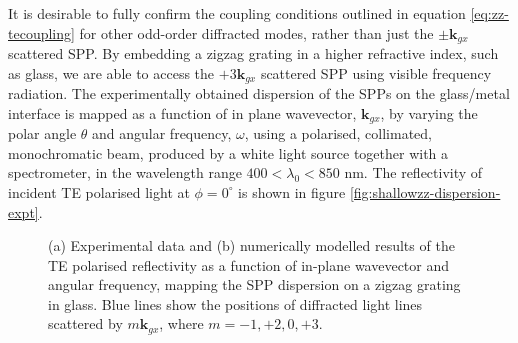 It is desirable to fully confirm the coupling conditions outlined in equation \ref{eq:zz-tecoupling} for other odd-order diffracted modes, rather than just the $\pm\mathbf{k}_{gx}$ scattered SPP. By embedding a zigzag grating in a higher refractive index, such as glass, we are able to access the $+3\mathbf{k}_{gx}$ scattered SPP using visible frequency radiation.
The experimentally obtained dispersion of the SPPs on the glass/metal interface is mapped as a function of in plane wavevector, $\mathbf{k}_{gx}$, by varying the polar angle $\theta$ and angular frequency, $\omega$, using a polarised, collimated, monochromatic beam, produced by a white light source together with a spectrometer, in the wavelength range $400 < \lambda_0 < 850$ nm.
The reflectivity of incident TE polarised light at $\phi = 0^\circ$ is shown in figure \ref{fig:shallowzz-dispersion-expt}. 
\begin{figure}
\begin{center}
\caption[SPP dispersion on a zigzag grating in glass measured using TE polarised light.]{(a) Experimental data and (b) numerically modelled results of the TE polarised reflectivity as a function of in-plane wavevector and angular frequency, mapping the SPP dispersion on a zigzag grating in glass. \color{blue}Blue \color{black} lines show the positions of diffracted light lines scattered by $m\mathbf{k}_{gx}$, where $m = −1, +2, 0, +3$.}
\end{center}
\end{figure}


